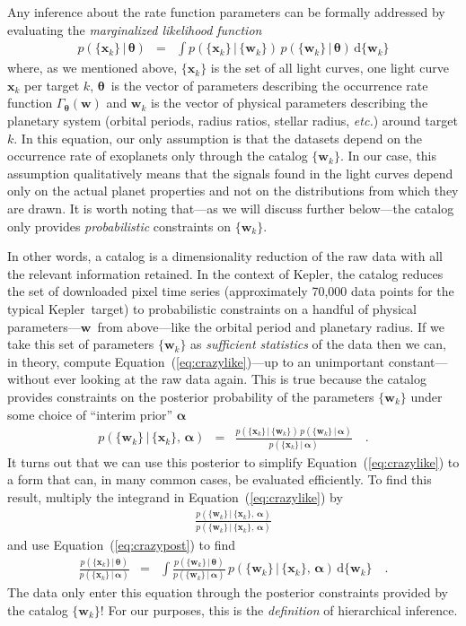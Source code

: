 \documentclass[12pt,preprint]{aastex}
\newcommand{\project}[1]{{\sffamily #1}}
\newcommand{\kepler}{\project{Kepler}}
\newcommand{\foreign}[1]{\emph{#1}}
\newcommand{\etc}{\foreign{etc.}}
\newcommand{\Eq}[1]{Equation~(\ref{eq:#1})}
\newcommand{\eq}[1]{\Eq{#1}}
\newcommand{\eqlabel}[1]{\label{eq:#1}}
\newcommand{\dd}{\ensuremath{\,\mathrm{d}}}
\newcommand{\bvec}[1]{\ensuremath{\boldsymbol{#1}}}
\newcommand{\rate}{\ensuremath{\Gamma}}
\newcommand{\ratepar}{{\ensuremath{\theta}}}
\newcommand{\ratepars}{{\ensuremath{\bvec{\ratepar}}}}
\newcommand{\data}{{\ensuremath{\bvec{x}}}}
\newcommand{\entry}{{\ensuremath{\bvec{w}}}}
\newcommand{\interim}{{\ensuremath{\bvec{\alpha}}}}
\begin{document}
Any inference about the rate function parameters can be formally addressed by
evaluating the \emph{marginalized likelihood function}
\begin{eqnarray}\eqlabel{crazylike}
p(\{\data_k\}\,|\,\ratepars) &=&
    \int p(\{\data_k\}\,|\,\{\entry_k\})
    \,p(\{\entry_k\}\,|\,\ratepars)
    \dd\{\entry_k\}
\end{eqnarray}
where, as we mentioned above, $\{\data_k\}$ is the set of all light curves,
one light curve $\data_k$ per target $k$, \ratepars\ is the vector of
parameters describing the occurrence rate function $\rate_\ratepars(\entry)$
and $\entry_k$ is the vector of physical parameters describing the planetary
system (orbital periods, radius ratios, stellar radius, \etc) around target
$k$.
In this equation, our only assumption is that the datasets depend on the
occurrence rate of exoplanets only through the catalog $\{\entry_k\}$.
In our case, this assumption qualitatively means that the signals found in the
light curves depend only on the actual planet properties and not on the
distributions from which they are drawn.
It is worth noting that---as we will discuss further below---the catalog only
provides \emph{probabilistic} constraints on $\{\entry_k\}$.

In other words, a catalog is a dimensionality reduction of the raw data with
all the relevant information retained.
In the context of \kepler, the catalog reduces the set of downloaded pixel
time series (approximately 70,000 data points for the typical \kepler\ target)
to probabilistic constraints on a handful of physical parameters---\entry\
from above---like the orbital period and planetary radius.
If we take this set of parameters $\{\entry_k\}$ as \emph{sufficient
statistics} of the data then we can, in theory, compute \eq{crazylike}---up to
an unimportant constant---without ever looking at the raw data again.
This is true because the catalog provides constraints on the posterior
probability of the parameters $\{\entry_k\}$ under some choice of ``interim
prior'' \interim
\begin{eqnarray}\eqlabel{crazypost}
p(\{\entry_k\}\,|\,\{\data_k\},\,\interim) &=&
\frac{p(\{\data_k\}\,|\,\{\entry_k\})\,p(\{\entry_k\}\,|\,\interim)}
     {p(\{\data_k\}\,|\,\interim)} \quad.
\end{eqnarray}
It turns out that we can use this posterior to simplify \eq{crazylike} to a
form that can, in many common cases, be evaluated efficiently.
To find this result, multiply the integrand in \eq{crazylike} by
\begin{eqnarray}
\frac{p(\{\entry_k\}\,|\,\{\data_k\},\,\interim)}
     {p(\{\entry_k\}\,|\,\{\data_k\},\,\interim)}
\end{eqnarray}
and use \eq{crazypost} to find
\begin{eqnarray}\eqlabel{simplemarglike}
\frac{p(\{\data_k\}\,|\,\ratepars)}{p(\{\data_k\}\,|\,\interim)} &=&
    \int
    \frac{p(\{\entry_k\}\,|\,\ratepars)}{p(\{\entry_k\}\,|\,\interim)}\,
    p(\{\entry_k\}\,|\,\{\data_k\},\,\interim)
    \dd\{\entry_k\} \quad.
\end{eqnarray}
The data only enter this equation through the posterior constraints provided
by the catalog $\{\entry_k\}$!
For our purposes, this is the \emph{definition} of hierarchical inference.
\end{document}
